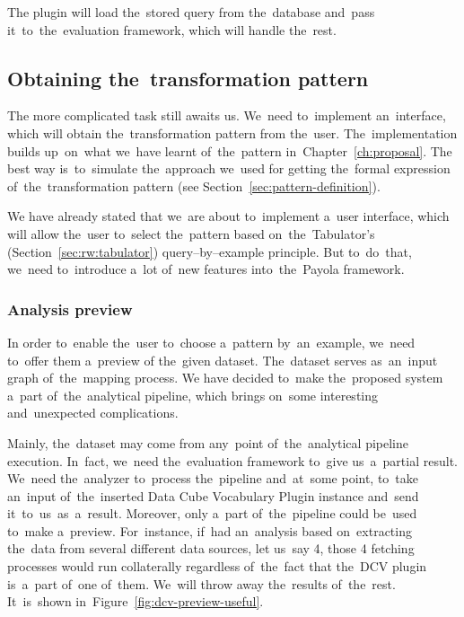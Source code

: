 The plugin will load the~stored query from the~database and~pass it~to~the~evaluation framework, which will handle the~rest.

\subsection{Obtaining the~transformation pattern}
The more complicated task still awaits us. We~need to~implement an~interface, 
which will obtain the~transformation pattern from the~user. The~implementation 
builds up~on~what we~have learnt of~the~pattern in~Chapter~\ref{ch:proposal}.
The best way is~to~simulate the~approach we~used for getting the~formal expression of~the~transformation pattern
(see Section~\ref{sec:pattern-definition}).

We have already stated that we~are about to~implement a~user interface, which 
will allow the~user to~select the~pattern based on~the~Tabulator's (Section~\ref{sec:rw:tabulator})
query--by--example principle. But to~do~that, we~need to~introduce a~lot of~new 
features into~the~Payola framework.

\subsubsection{Analysis preview}
In order to~enable the~user to~choose a~pattern by~an~example, we~need to~offer them a~preview
of the~given dataset. The~dataset serves as~an~input graph of~the~mapping process. 
We have decided to~make the~proposed system a~part of~the~analytical 
pipeline, which brings on~some interesting and~unexpected complications.

Mainly, the~dataset may come from any~point of~the~analytical pipeline execution. In~fact, we~need the~evaluation framework to~give us~a~partial result. We~need the~analyzer to~process the~pipeline and~at~some point, to~take an~input of~the~inserted Data Cube Vocabulary Plugin instance and~send it~to~us~as~a~result. 
Moreover, only a~part of~the~pipeline could be~used to~make a~preview. For~instance, if~had an~analysis
based on~extracting the~data from several different data sources, 
let us~say 4, those 4 fetching processes would run collaterally regardless of~the~fact that the~DCV plugin is~a~part of~one of~them. We~will throw away the~results of~the~rest. It~is~shown in~Figure~\ref{fig:dcv-preview-useful}.

